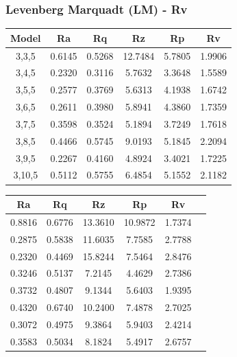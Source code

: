 \documentclass[suppldata]{interact}
\begin{document}
\subsubsection{ Levenberg Marquadt (LM) -  Rv} 
 \begin{minipage}{0.40\textwidth}
  \small
 \centering
    \begin{tabular}{|c|c|c|c|c|c|}
    \hline
        Model & Ra &  Rq &  Rz &  Rp & Rv \\ \hline
        3,3,5 & 0.6145 & 0.5268 & 12.7484 & 5.7805 & 1.9906 \\ \hline
        3,4,5 & 0.2320 & 0.3116 & 5.7632 & 3.3648 & 1.5589 \\ \hline
        3,5,5 & 0.2577 & 0.3769 & 5.6313 & 4.1938 & 1.6742 \\ \hline
        3,6,5 & 0.2611 & 0.3980 & 5.8941 & 4.3860 & 1.7359 \\ \hline
        3,7,5 & 0.3598 & 0.3524 & 5.1894 & 3.7249 & 1.7618 \\ \hline
        3,8,5 & 0.4466 & 0.5745 & 9.0193 & 5.1845 & 2.2094 \\ \hline
        3,9,5 & 0.2267 & 0.4160 & 4.8924 & 3.4021 & 1.7225 \\ \hline
        3,10,5 & 0.5112 & 0.5755 & 6.4854 & 5.1552 & 2.1182 \\ \hline
    \end{tabular}
        \label{tab:lmmsetr}
    \end{minipage}
    \hfill 
     \begin{minipage}{0.38\textwidth} 
   \small
 \centering
    \begin{tabular}{|c|c|c|c|c|c|}
    \hline
        Ra &  Rq &  Rz &  Rp & Rv \\ \hline
         0.8816 & 0.6776 & 13.3610 & 10.9872 & 1.7374 \\ \hline
         0.2875 & 0.5838 & 11.6035 & 7.7585 & 2.7788 \\ \hline
         0.2320 & 0.4469 & 15.8244 & 7.5464 & 2.8476 \\ \hline
         0.3246 & 0.5137 & 7.2145 & 4.4629 & 2.7386 \\ \hline
         0.3732 & 0.4807 & 9.1344 & 5.6403 & 1.9395 \\ \hline
         0.4320 & 0.6740 & 10.2400 & 7.4878 & 2.7025 \\ \hline
         0.3072 & 0.4975 & 9.3864 & 5.9403 & 2.4214 \\ \hline
         0.3583 & 0.5034 & 8.1824 & 5.4917 & 2.6757 \\ \hline
    \end{tabular}
        \label{tab:lmmsete}
    \end{minipage}
\end{document}
